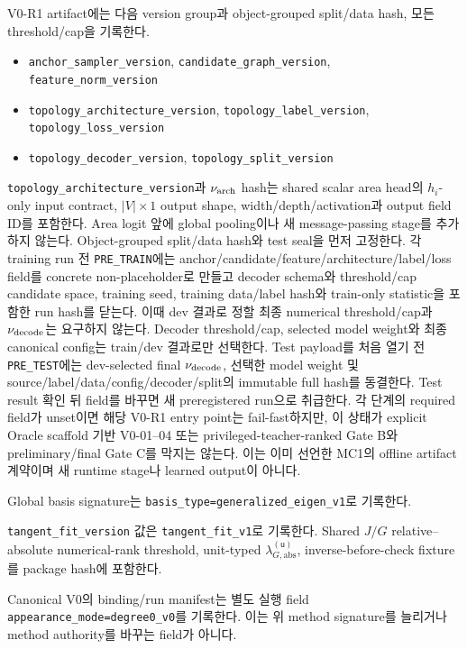 \documentclass[10pt]{article}
\newcommand{\code}[1]{{\small\nolinkurl{#1}}}
\begin{document}
V0-R1 artifact에는 다음 version group과 object-grouped split/data hash,
모든 threshold/cap을 기록한다.
\begin{itemize}
  \item \code{anchor\_sampler\_version}, \code{candidate\_graph\_version},
  \code{feature\_norm\_version}
  \item \code{topology\_architecture\_version}, \code{topology\_label\_version},
  \code{topology\_loss\_version}
  \item \code{topology\_decoder\_version}, \code{topology\_split\_version}
\end{itemize}
\code{topology\_architecture\_version}과 \(\nu_{\rm arch}\) hash는
shared scalar area head의 \(h_i\)-only input contract, \(|V|\times1\) output shape,
width/depth/activation과 output field ID를 포함한다. Area logit 앞에 global pooling이나
새 message-passing stage를 추가하지 않는다.
Object-grouped split/data hash와 test seal을 먼저 고정한다.
각 training run 전 \code{PRE\_TRAIN}에는 anchor/candidate/feature/architecture/label/loss field를
concrete non-placeholder로 만들고 decoder schema와 threshold/cap candidate space,
training seed, training data/label hash와 train-only statistic을 포함한 run hash를 닫는다.
이때 dev 결과로 정할 최종 numerical threshold/cap과 \(\nu_{\rm decode}\)는 요구하지 않는다.
Decoder threshold/cap, selected model weight와 최종 canonical config는 train/dev 결과로만 선택한다.
Test payload를 처음 열기 전 \code{PRE\_TEST}에는 dev-selected final \(\nu_{\rm decode}\),
선택한 model weight 및 source/label/data/config/decoder/split의 immutable full hash를 동결한다.
Test result 확인 뒤 field를 바꾸면 새 preregistered run으로 취급한다.
각 단계의 required field가 unset이면 해당 V0-R1 entry point는 fail-fast하지만,
이 상태가 explicit Oracle scaffold 기반 V0-01--04 또는 privileged-teacher-ranked Gate B와
preliminary/final Gate C를 막지는 않는다.
이는 이미 선언한 MC1의 offline artifact 계약이며 새 runtime stage나 learned output이 아니다.

Global basis signature는 \code{basis\_type=generalized\_eigen\_v1}로 기록한다.

\code{tangent\_fit\_version} 값은 \code{tangent\_fit\_v1}로 기록한다.
Shared \(J/G\) relative--absolute numerical-rank threshold,
unit-typed \(\lambda_{G,\mathrm{abs}}^{(\mathsf u)}\), inverse-before-check fixture를 package hash에 포함한다.

Canonical V0의 binding/run manifest는 별도 실행 field
\code{appearance\_mode=degree0\_v0}를 기록한다. 이는 위 method signature를
늘리거나 method authority를 바꾸는 field가 아니다.
\end{document}
